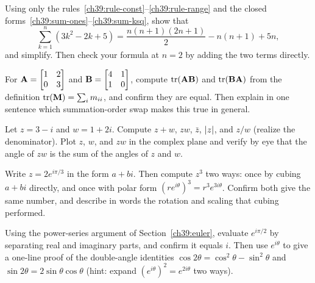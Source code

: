 \begin{exercise}
\label{ch39:ex2}
Using only the rules~\eqref{ch39:rule-const}--\eqref{ch39:rule-range} and the closed
forms~\eqref{ch39:sum-ones}--\eqref{ch39:sum-ksq}, show that
\[
\sum_{k=1}^{n}(3k^2 - 2k + 5) = \frac{n(n+1)(2n+1)}{2} - n(n+1) + 5n,
\]
and simplify. Then check your formula at $n=2$ by adding the two terms directly.
\end{exercise}

\begin{exercise}
\label{ch39:ex3}
For $\mathbf{A} = \begin{bmatrix}1 & 2\\ 0 & 3\end{bmatrix}$ and $\mathbf{B} = \begin{bmatrix}4 & 1\\ 1 &
0\end{bmatrix}$, compute $\operatorname{tr}(\mathbf{A}\mathbf{B})$ and $\operatorname{tr}(\mathbf{B}\mathbf{A})$ from the definition
$\operatorname{tr}(\mathbf{M}) = \sum_i m_{ii}$, and confirm they are equal. Then explain in one sentence which
summation-order swap makes this true in general.
\end{exercise}

\begin{exercise}
\label{ch39:ex4}
Let $z = 3 - i$ and $w = 1 + 2i$. Compute $z + w$, $zw$, $\bar z$, $\lvert z\rvert$, and $z/w$ (realize the
denominator). Plot $z$, $w$, and $zw$ in the complex plane and verify by eye that the angle of $zw$
is the sum of the angles of $z$ and $w$.
\end{exercise}

\begin{exercise}
\label{ch39:ex5}
Write $z = 2e^{i\pi/3}$ in the form $a + bi$. Then compute $z^3$ two ways: once by cubing $a+bi$
directly, and once with polar form $(re^{i\theta})^3 = r^3 e^{3i\theta}$. Confirm both give the same
number, and describe in words the rotation and scaling that cubing performed.
\end{exercise}

\begin{exercise}
\label{ch39:ex6}
Using the power-series argument of Section~\ref{ch39:euler}, evaluate $e^{i\pi/2}$ by separating real
and imaginary parts, and confirm it equals $i$. Then use $e^{i\theta}$ to give a one-line proof of
the double-angle identities $\cos 2\theta = \cos^2\theta - \sin^2\theta$ and $\sin 2\theta =
2\sin\theta\cos\theta$ (hint: expand $(e^{i\theta})^2 = e^{2i\theta}$ two ways).
\end{exercise}

